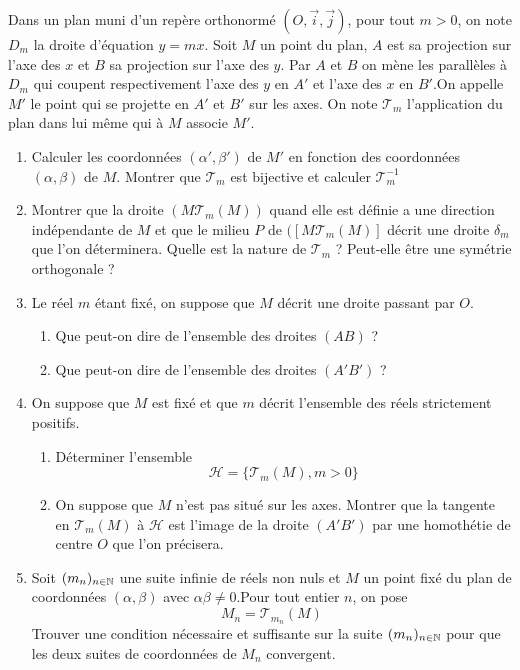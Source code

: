 Dans un plan muni d'un rep{\`e}re orthonorm{\'e}
$(O,\overrightarrow{i},\overrightarrow{j})$, pour tout $m>0$, on
note $D_m$ la droite d'{\'e}quation $y=mx$. Soit $M$ un point du plan,
$A$ est sa projection sur l'axe des $x$ et $B$ sa projection sur
l'axe des $y$. Par $A$ et $B$ on m{\`e}ne les parall{\`e}les {\`a} $D_m$ qui
coupent respectivement l'axe des $y$ en $A'$ et l'axe des $x$ en
$B'$.On appelle $M'$ le point qui se projette en $A'$ et $B'$ sur
les axes. On note $\mathcal{T}_m$ l'application du plan dans lui
m{\^e}me qui {\`a} $M$ associe $M'$.
\begin{enumerate}
  \item Calculer les coordonn{\'e}es $(\alpha ',\beta ')$ de $M'$ en
  fonction des coordonn{\'e}es $(\alpha,\beta)$ de $M$. Montrer que
  $\mathcal{T}_m$ est bijective et calculer $\mathcal{T}_m ^{-1}$
  \item Montrer que la droite $(M\mathcal{T}_m(M))$ quand elle est
  d{\'e}finie a une direction ind{\'e}pendante de $M$ et que le milieu $P$
  de $([M\mathcal{T}_m(M)]$ d{\'e}crit une droite $\delta_m$ que l'on
  d{\'e}terminera. Quelle est la nature de $\mathcal{T}_m$ ? Peut-elle
  {\^e}tre une sym{\'e}trie orthogonale ?
  \item Le r{\'e}el $m$ {\'e}tant fix{\'e}, on suppose que $M$ d{\'e}crit une
  droite passant par $O$.
    \begin{enumerate}
      \item Que peut-on dire de l'ensemble des droites $(AB)$ ?
      \item Que peut-on dire de l'ensemble des droites $(A'B')$ ?
    \end{enumerate}

  \item On suppose que $M$ est fix{\'e} et que $m$ d{\'e}crit l'ensemble
  des r{\'e}els strictement positifs.
    \begin{enumerate}
      \item D{\'e}terminer l'ensemble
      \[\mathcal{H}=\{\mathcal{T}_m(M), m>0\}\]
      \item On suppose que $M$ n'est pas situ{\'e} sur les axes.
      Montrer que la tangente en $\mathcal{T}_m(M)$ {\`a}
      $\mathcal{H}$ est l'image de la droite $(A'B')$ par une
      homoth{\'e}tie de centre $O$ que l'on pr{\'e}cisera.
    \end{enumerate}

  \item Soit $(m_n)_{n\in \Bbb{N}}$ une suite infinie de r{\'e}els non
  nuls et $M$ un point fix{\'e} du plan de coordonn{\'e}es $(\alpha,\beta)$ avec $\alpha \beta \neq
  0$.Pour tout entier $n$, on pose
  \[M_n=\mathcal{T}_{m_n}(M)\]
  Trouver une condition n{\'e}cessaire et suffisante sur la suite $(m_n)_{n\in
  \Bbb{N}}$ pour que les deux suites de coordonn{\'e}es de $M_n$
  convergent.
\end{enumerate}
